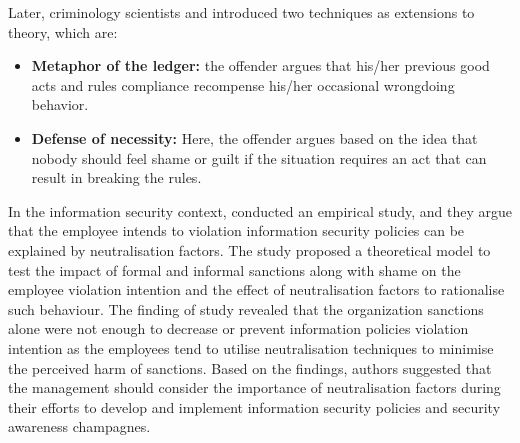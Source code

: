 Later, criminology scientists \citet{Rogers1974} and \citet{Minor1981} introduced two techniques as extensions to \citet{Sykes1957} theory, which are:
\begin{itemize}
\item \textbf{Metaphor of the ledger:} the offender argues that his/her previous good acts and rules compliance recompense his/her occasional wrongdoing behavior\cite{Rogers1974}.
\item \textbf{Defense of necessity:} Here, the offender argues based on the idea that nobody should feel shame or guilt if the situation requires an act that can result in breaking the rules\cite{Minor1981}.
\end{itemize}

In the information security context, \citet{Siponen2010}conducted an empirical study, and they argue that the employee intends to violation information security policies can be explained by neutralisation factors. The study proposed a theoretical model to test the impact of formal and informal sanctions along with shame on the employee violation intention and the effect of neutralisation factors to rationalise such behaviour. The finding of \cite{Siponen2010} study revealed that the organization sanctions alone were not enough to decrease or prevent information policies violation intention as the employees tend to utilise neutralisation techniques to minimise the perceived harm of sanctions. Based on the findings, authors suggested that the management should consider the importance of neutralisation factors during their efforts to develop and implement information security policies and security awareness champagnes.

